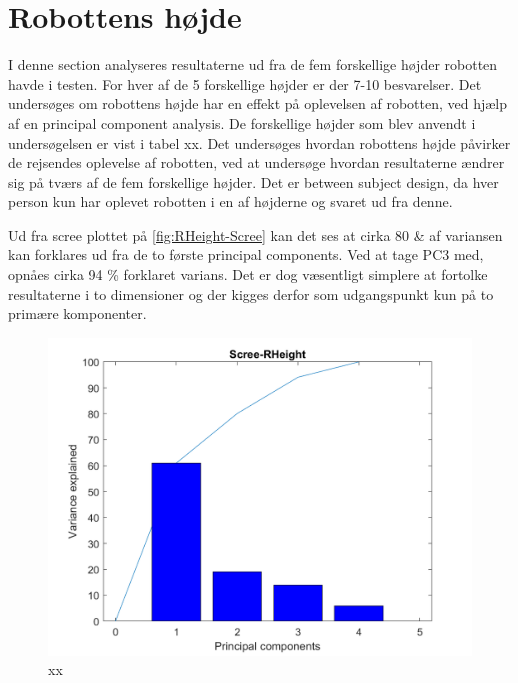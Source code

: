 \section{Robottens højde}
\label{sec:RHeight}
%
I denne section analyseres resultaterne ud fra de fem forskellige højder robotten havde i testen. For hver af de 5 forskellige højder er der 7-10 besvarelser. Det undersøges om robottens højde har en effekt på oplevelsen af robotten, ved hjælp af en principal component analysis. De forskellige højder som blev anvendt i undersøgelsen er vist i tabel xx. Det undersøges hvordan robottens højde påvirker de rejsendes oplevelse af robotten, ved at undersøge hvordan resultaterne ændrer sig på tværs af de fem forskellige højder. Det er between subject design, da hver person kun har oplevet robotten i en af højderne og svaret ud fra denne. 

Ud fra scree plottet på \autoref{fig:RHeight-Scree} kan det ses at cirka 80 \& af variansen kan forklares ud fra de to første principal components. Ved at tage PC3 med, opnåes cirka 94 \% forklaret varians. Det er dog væsentligt simplere at fortolke resultaterne i to dimensioner og der kigges derfor som udgangspunkt kun på to primære komponenter.

\begin{figure}[H]
\centering
\includegraphics[width=\textwidth]{Figure/DatabehandlingSkalaer/PCAfigures/RHeight-Scree.png}
\caption{xx}
\label{fig:RHeight-Scree}
\end{figure}

